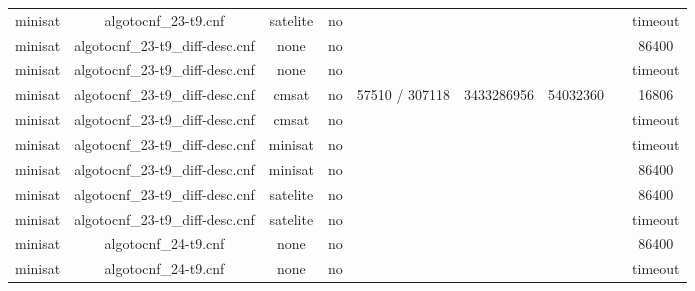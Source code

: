 \begin{appendices}
\begin{table}[p]
\begin{center}
\begin{tabular}{l|cccccccc}
  minisat                        & algotocnf\_23-t9.cnf           & satelite   & no    &            &           &           &            & timeout \\ %
  minisat                        & algotocnf\_23-t9\_diff-desc.cnf & none       & no    &            &           &           &            & 86400 \\ %
  minisat                        & algotocnf\_23-t9\_diff-desc.cnf & none       & no    &            &           &           &            & timeout \\ %
  minisat                        & algotocnf\_23-t9\_diff-desc.cnf & cmsat      & no    & 57510 / 307118 & 3433286956 & 54032360  &            & 16806 \\ %
  minisat                        & algotocnf\_23-t9\_diff-desc.cnf & cmsat      & no    &            &           &           &            & timeout \\ %
  minisat                        & algotocnf\_23-t9\_diff-desc.cnf & minisat    & no    &            &           &           &            & timeout \\ %
  minisat                        & algotocnf\_23-t9\_diff-desc.cnf & minisat    & no    &            &           &           &            & 86400 \\ %
  minisat                        & algotocnf\_23-t9\_diff-desc.cnf & satelite   & no    &            &           &           &            & 86400 \\ %
  minisat                        & algotocnf\_23-t9\_diff-desc.cnf & satelite   & no    &            &           &           &            & timeout \\ %
  minisat                        & algotocnf\_24-t9.cnf           & none       & no    &            &           &           &            & 86400 \\ %
  minisat                        & algotocnf\_24-t9.cnf           & none       & no    &            &           &           &            & timeout \\ %

\end{tabular}
\end{center}
\end{table}
\end{appendices}
